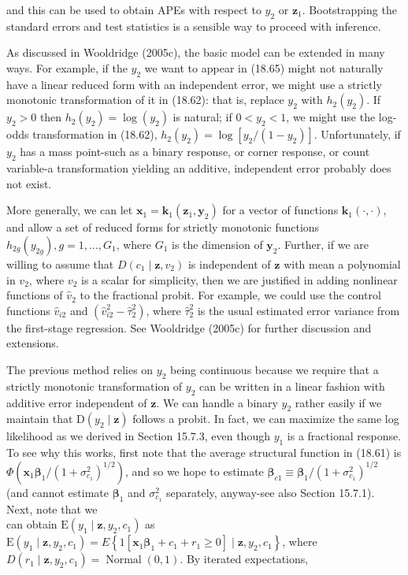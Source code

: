 \documentclass[10pt]{article}
\begin{document}
and this can be used to obtain APEs with respect to $y_{2}$ or $\mathbf{z}_{1}$. Bootstrapping the standard errors and test statistics is a sensible way to proceed with inference.

As discussed in Wooldridge (2005c), the basic model can be extended in many ways. For example, if the $y_{2}$ we want to appear in (18.65) might not naturally have a linear reduced form with an independent error, we might use a strictly monotonic transformation of it in (18.62): that is, replace $y_{2}$ with $h_{2}\left(y_{2}\right)$. If $y_{2}>0$ then $h_{2}\left(y_{2}\right)= \log \left(y_{2}\right)$ is natural; if $0<y_{2}<1$, we might use the log-odds transformation in (18.62), $h_{2}\left(y_{2}\right)=\log \left[y_{2} /\left(1-y_{2}\right)\right]$. Unfortunately, if $y_{2}$ has a mass point-such as a binary response, or corner response, or count variable-a transformation yielding an additive, independent error probably does not exist.

More generally, we can let $\mathbf{x}_{1}=\mathbf{k}_{1}\left(\mathbf{z}_{1}, \mathbf{y}_{2}\right)$ for a vector of functions $\mathbf{k}_{1}(\cdot, \cdot)$, and allow a set of reduced forms for strictly monotonic functions $h_{2 g}\left(y_{2 g}\right), g=1, \ldots, G_{1}$, where $G_{1}$ is the dimension of $\mathbf{y}_{2}$. Further, if we are willing to assume that $D\left(c_{1} \mid \mathbf{z}, v_{2}\right)$ is independent of $\mathbf{z}$ with mean a polynomial in $v_{2}$, where $v_{2}$ is a scalar for simplicity, then we are justified in adding nonlinear functions of $\hat{v}_{2}$ to the fractional probit. For example, we could use the control functions $\hat{v}_{i 2}$ and $\left(\hat{v}_{i 2}^{2}-\hat{\tau}_{2}^{2}\right)$, where $\hat{\tau}_{2}^{2}$ is the usual estimated error variance from the first-stage regression. See Wooldridge (2005c) for further discussion and extensions.

The previous method relies on $y_{2}$ being continuous because we require that a strictly monotonic transformation of $y_{2}$ can be written in a linear fashion with additive error independent of $\mathbf{z}$. We can handle a binary $y_{2}$ rather easily if we maintain that $\mathrm{D}\left(y_{2} \mid \mathbf{z}\right)$ follows a probit. In fact, we can maximize the same log likelihood as we derived in Section 15.7.3, even though $y_{1}$ is a fractional response. To see why this works, first note that the average structural function in (18.61) is $\Phi\left(\mathbf{x}_{1} \boldsymbol{\beta}_{1} /\left(1+\sigma_{c_{1}}^{2}\right)^{1 / 2}\right)$, and so we hope to estimate $\boldsymbol{\beta}_{c 1} \equiv \boldsymbol{\beta}_{1} /\left(1+\sigma_{c_{1}}^{2}\right)^{1 / 2}$ (and cannot estimate $\boldsymbol{\beta}_{1}$ and $\sigma_{c_{1}}^{2}$ separately, anyway-see also Section 15.7.1). Next, note that we\\
can obtain $\mathrm{E}\left(y_{1} \mid \mathbf{z}, y_{2}, c_{1}\right)$ as $\mathrm{E}\left(y_{1} \mid \mathbf{z}, y_{2}, c_{1}\right)=E\left\{1\left[\mathbf{x}_{1} \boldsymbol{\beta}_{1}+c_{1}+r_{1} \geq 0\right] \mid \mathbf{z}, y_{2}, c_{1}\right\}$, where $D\left(r_{1} \mid \mathbf{z}, y_{2}, c_{1}\right)=\operatorname{Normal}(0,1)$. By iterated expectations,
\end{document}
